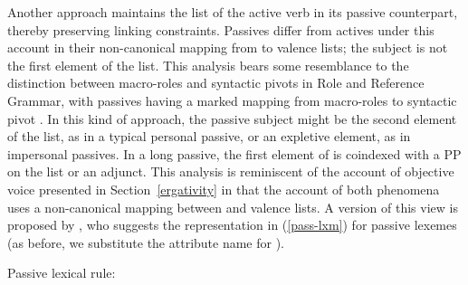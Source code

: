 \documentclass[output=paper,biblatex,babelshorthands,newtxmath,draftmode,colorlinks, citecolor=brown]{langscibook}
\begin{document}
Another approach maintains the \argst list of the active verb in its passive counterpart, thereby preserving linking constraints.
Passives differ from actives under this account in their non-canonical mapping from \argst to valence lists; the subject is not the first element of the \argst list. This analysis bears some resemblance to the distinction between macro-roles and syntactic pivots in Role and Reference Grammar, with passives having a marked mapping from macro-roles to syntactic pivot \citep{VanValinandLapolla1997}.  
In this kind of approach, the passive subject might be the second element of the \argst list, as in a typical personal passive, or an expletive element, as in impersonal passives.
In a long passive, the first element of \argst is coindexed with a PP on the  list or an adjunct.
This analysis is reminiscent of the account of  objective voice presented in Section~\ref{ergativity} in that the account of both phenomena uses a non-canonical mapping between \argst and valence lists.
A version of this view is proposed by \citet[246]{Davis2001}, who suggests the representation in (\ref{pass-lxm}) for passive lexemes (as before, we substitute the attribute name  for ).

\ea
\label{pass-lxm}
Passive lexical rule:\\
\z
\end{document}

